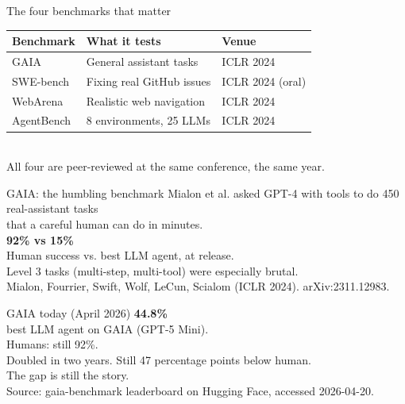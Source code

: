 \documentclass[aspectratio=169, 12pt, xcolor={dvipsnames,table}]{beamer}
\newcommand{\bignum}[1]{{\fontsize{60}{66}\selectfont\bfseries\color{accent}#1}}
\begin{document}
\begin{frame}{The four benchmarks that matter}
  \vfill
  \centering
  \begin{tabular}{lll}
    \toprule
    \textbf{Benchmark} & \textbf{What it tests} & \textbf{Venue}\\
    \midrule
    GAIA & General assistant tasks & ICLR 2024\\
    SWE-bench & Fixing real GitHub issues & ICLR 2024 (oral)\\
    WebArena & Realistic web navigation & ICLR 2024\\
    AgentBench & 8 environments, 25 LLMs & ICLR 2024\\
    \bottomrule
  \end{tabular}\\[1em]
  {\color{mute}\small All four are peer-reviewed at the same conference, the same year.}
  \vfill
\end{frame}

\begin{frame}{GAIA: the humbling benchmark}
  \vfill
  \centering
  {\Large Mialon et al. asked GPT-4 with tools to do 450 real-assistant tasks}\\[0.3em]
  {\Large that a careful human can do in minutes.}\\[1.2em]
  \bignum{92\% vs 15\%}\\[0.4em]
  {\large Human success vs. best LLM agent, at release.}\\[0.6em]
  {\color{mute}Level 3 tasks (multi-step, multi-tool) were especially brutal.}\\[1em]
  {\scriptsize\color{mute}Mialon, Fourrier, Swift, Wolf, LeCun, Scialom (ICLR 2024). arXiv:2311.12983.}
  \vfill
\end{frame}

\begin{frame}{GAIA today (April 2026)}
  \vfill
  \centering
  \bignum{44.8\%}\\[0.4em]
  {\large best LLM agent on GAIA (GPT-5 Mini).}\\[0.8em]
  {\Large Humans: still {\color{accent}92\%}.}\\[1.5em]
  {\color{mute}Doubled in two years. Still 47 percentage points below human.}\\[0.6em]
  {\color{mute}The gap is still the story.}\\[0.6em]
  {\scriptsize\color{mute}Source: gaia-benchmark leaderboard on Hugging Face, accessed 2026-04-20.}
  \vfill
\end{frame}
\end{document}
